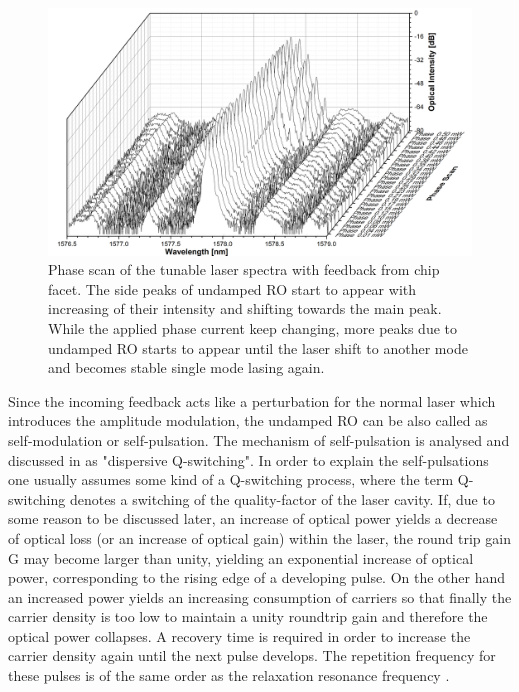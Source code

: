 \begin{figure}[ht]
    \centering
    \includegraphics[width=.8\linewidth]{figures/Undamped_RO_phase_scan_grating_4621.png}
    \caption{Phase scan of the tunable laser spectra with feedback from chip facet. The side peaks of undamped RO start to appear with increasing of their intensity and shifting towards the main peak. While the applied phase current keep changing, more peaks due to undamped RO starts to appear until the laser shift to another mode and becomes stable single mode lasing again.}
    \label{fig:undamped_RO_phase_scan}
\end{figure}



Since the incoming feedback acts like a perturbation for the normal laser which introduces the amplitude modulation, the undamped RO can be also called as self-modulation or self-pulsation. The mechanism of self-pulsation is analysed and discussed in \cite{bandelow1993theory} as "dispersive Q-switching". In order to explain the self-pulsations one usually assumes some kind of a Q-switching process, where the term Q-switching denotes a switching of the quality-factor of the laser cavity. If, due to some reason to be discussed later, an increase of optical power yields a decrease of optical loss (or an increase of optical gain) within the laser, the round trip gain G may become larger than unity, yielding an exponential increase of optical power, corresponding to the rising edge of a developing pulse. On the other hand an increased power yields an increasing consumption of carriers so that finally the carrier density is too low to maintain a unity roundtrip gain and therefore the optical power collapses. A recovery time is required in order to increase the carrier density again until the next pulse develops. The repetition frequency for these pulses is of the same order as the relaxation resonance frequency \cite{petermann2012laser}.

